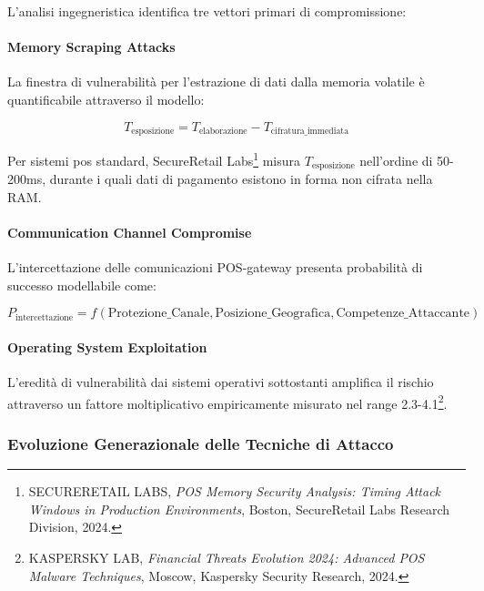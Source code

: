 L'analisi ingegneristica identifica tre vettori primari di compromissione:

\paragraph{Memory Scraping Attacks}

La finestra di vulnerabilità per l'estrazione di dati dalla memoria volatile è quantificabile attraverso il modello:

\begin{equation}
T_{\text{esposizione}} = T_{\text{elaborazione}} - T_{\text{cifratura\_immediata}}
\label{eq:tempo-esposizione}
\end{equation}

Per sistemi \gls{pos} standard, SecureRetail Labs\footnote{SECURERETAIL LABS, \textit{POS Memory Security Analysis: Timing Attack Windows in Production Environments}, Boston, SecureRetail Labs Research Division, 2024.} misura $T_{\text{esposizione}}$ nell'ordine di 50-200ms, durante i quali dati di pagamento esistono in forma non cifrata nella RAM.

\paragraph{Communication Channel Compromise}

L'intercettazione delle comunicazioni POS-gateway presenta probabilità di successo modellabile come:

\begin{equation}
P_{\text{intercettazione}} = f(\text{Protezione\_Canale}, \text{Posizione\_Geografica}, \text{Competenze\_Attaccante})
\label{eq:prob-intercettazione}
\end{equation}

\paragraph{Operating System Exploitation}

L'eredità di vulnerabilità dai sistemi operativi sottostanti amplifica il rischio attraverso un fattore moltiplicativo empiricamente misurato nel range 2.3-4.1\footnote{KASPERSKY LAB, \textit{Financial Threats Evolution 2024: Advanced POS Malware Techniques}, Moscow, Kaspersky Security Research, 2024.}.

\subsubsection{Evoluzione Generazionale delle Tecniche di Attacco}

